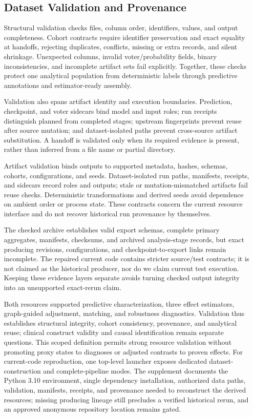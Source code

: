 \documentclass[letterpaper]{article}
\begin{document}
\subsection{Dataset Validation and Provenance}

Structural validation checks files, column order, identifiers, values, and
output completeness. Cohort contracts require identifier preservation and exact
equality at handoffs, rejecting duplicates, conflicts, missing or extra records,
and silent shrinkage. Unexpected columns, invalid voter/probability fields,
binary inconsistencies, and incomplete artifact sets fail explicitly. Together,
these checks protect one analytical population from deterministic labels through
predictive annotations and estimator-ready assembly.

Validation also spans artifact identity and execution boundaries. Prediction,
checkpoint, and voter sidecars bind model and input roles; run receipts
distinguish planned from completed stages; upstream fingerprints prevent reuse
after source mutation; and dataset-isolated paths prevent cross-source artifact
substitution. A handoff is validated only when its required evidence is present,
rather than inferred from a file name or partial directory.

Artifact validation binds outputs to supported metadata, hashes, schemas,
cohorts, configurations, and seeds. Dataset-isolated run paths, manifests,
receipts, and sidecars record roles and outputs; stale or mutation-mismatched
artifacts fail reuse checks. Deterministic transformations and derived seeds
avoid dependence on ambient order or process state. These contracts concern the
current resource interface and do not recover historical run provenance by
themselves.

The checked archive establishes valid export schemas, complete primary
aggregates, manifests, checksums, and archived analysis-stage records, but exact
producing revisions, configurations, and checkpoint-to-export links remain
incomplete. The repaired current code contains stricter source/test contracts;
it is not claimed as the historical producer, nor do we claim current test
execution. Keeping these evidence layers separate avoids turning checked output
integrity into an unsupported exact-rerun claim.

Both resources supported predictive characterization, three effect estimators,
graph-guided adjustment, matching, and robustness diagnostics. Validation thus
establishes structural integrity, cohort consistency, provenance, and analytical
reuse; clinical construct validity and causal identification remain separate
questions. This scoped definition permits strong resource validation without
promoting proxy states to diagnoses or adjusted contrasts to proven effects.
For current-code reproduction, one top-level launcher exposes dedicated
dataset-construction and complete-pipeline modes. The supplement documents the
Python 3.10 environment, single dependency installation, authorized data paths,
validation, manifests, receipts, and provenance needed to reconstruct the
derived resources; missing producing lineage still precludes a verified
historical rerun, and an approved anonymous repository location remains gated.
\end{document}
